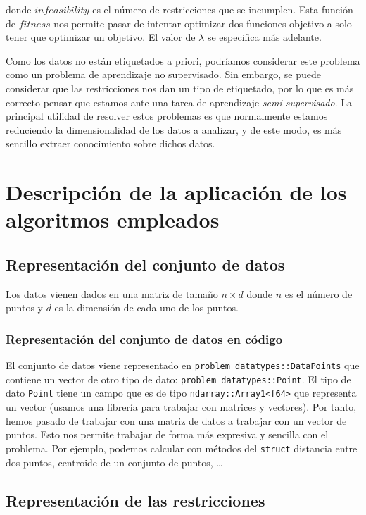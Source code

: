 \documentclass[11pt]{article}
\begin{document}
donde $infeasibility$ es el número de restricciones que se incumplen. Esta función de $fitness$ nos permite pasar de intentar optimizar dos funciones objetivo a solo tener que optimizar un objetivo. El valor de $\lambda$ se especifica más adelante.

Como los datos no están etiquetados a priori, podríamos considerar este problema como un problema de aprendizaje no supervisado. Sin embargo, se puede considerar que las restricciones nos dan un tipo de etiquetado, por lo que es más correcto pensar que estamos ante una tarea de aprendizaje \emph{semi-supervisado}. La principal utilidad de resolver estos problemas es que normalmente estamos reduciendo la dimensionalidad de los datos a analizar, y de este modo, es más sencillo extraer conocimiento sobre dichos datos.

\pagebreak

\section{Descripción de la aplicación de los algoritmos empleados}

\subsection{Representación del conjunto de datos}

Los datos vienen dados en una matriz de tamaño $n \times d$ donde $n$ es el número de puntos y $d$ es la dimensión de cada uno de los puntos.

\subsubsection{Representación del conjunto de datos en código}

El conjunto de datos viene representado en \lstinline{problem_datatypes::DataPoints} que contiene un vector de otro tipo de dato: \lstinline{problem_datatypes::Point}. El tipo de dato \lstinline{Point} tiene un campo que es de tipo \lstinline{ndarray::Array1<f64>} que representa un vector (usamos una librería para trabajar con matrices y vectores). Por tanto, hemos pasado de trabajar con una matriz de datos a trabajar con un vector de puntos. Esto nos permite trabajar de forma más expresiva y sencilla con el problema. Por ejemplo, podemos calcular con métodos del \lstinline{struct} distancia entre dos puntos, centroide de un conjunto de puntos, \ldots

\subsection{Representación de las restricciones}
\end{document}
